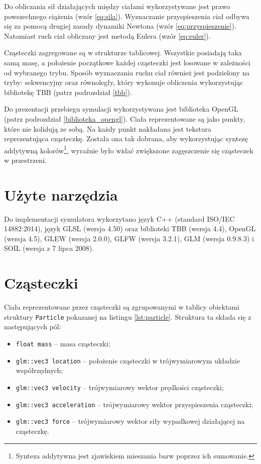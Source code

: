 \documentclass[12pt, twoside, openany]{report}
\begin{document}
Do obliczania sił działających między ciałami wykorzystywane jest prawo powszechnego ciążenia (wzór \ref{eq:sila}). Wyznaczanie przyspieszenia ciał odbywa się za pomocą drugiej zasady dynamiki Newtona (wzór \ref{eq:przyspieszenie}). Natomiast ruch ciał obliczany jest metodą Eulera (wzór \ref{eq:euler}).

Cząsteczki zagregowane są w strukturze tablicowej. Wszystkie posiadają taka samą masę, a położenie początkowe każdej cząsteczki jest losowane w zależności od wybranego trybu. Sposób wyznaczania ruchu ciał również jest podzielony na tryby: sekwencyjny oraz równoległy, który wykonuje obliczenia wykorzystując bibliotekę TBB (patrz podrozdział \ref{tbb}).

Do prezentacji przebiegu symulacji wykorzystywana jest biblioteka OpenGL (patrz podrozdział \ref{biblioteka_opengl}). Ciała reprezentowane są jako punkty, które nie kolidują ze sobą. Na każdy punkt nakładana jest tekstura reprezentująca cząsteczkę. Została ona tak dobrana, aby wykorzystując syntezę addytywną kolorów\footnote{Synteza addytywna jest zjawiskiem mieszania barw poprzez ich sumowanie.}, wyraźnie było widać zwiększone zagęszczenie się cząsteczek w przestrzeni.


\section{Użyte narzędzia}

Do implementacji symulatora wykorzytano język C++ (standard ISO/IEC 14882:2014), język GLSL (wersja 4.50) oraz biblioteki TBB (wersja 4.4), OpenGL (wersja 4.5), GLEW (wersja 2.0.0), GLFW (wersja 3.2.1), GLM (wersja 0.9.8.3) i SOIL (wersja z 7 lipca 2008).

\section{Cząsteczki}

Ciała reprezentowane przez cząsteczki są zgrupowanymi w tablicy obiektami struktury \texttt{Particle} pokazanej na listingu \ref{lst:particle}. Struktura ta składa się z następujących pól:
\begin{itemize}

\item \texttt{float mass} -- masa cząsteczki;
\item \texttt{glm::vec3 location} -- położenie cząsteczki w trójwymiarowym układzie współrzędnych;
\item \texttt{glm::vec3 velocity} -- trójwymiarowy wektor prędkości cząsteczki;
\item \texttt{glm::vec3 acceleration} -- trójwymiarowy wektor przyspieszenia cząsteczki;
\item \texttt{glm::vec3 force} -- trójwymiarowy wektor siły wypadkowej działającej na cząsteczkę.
\end{itemize}
\end{document}
